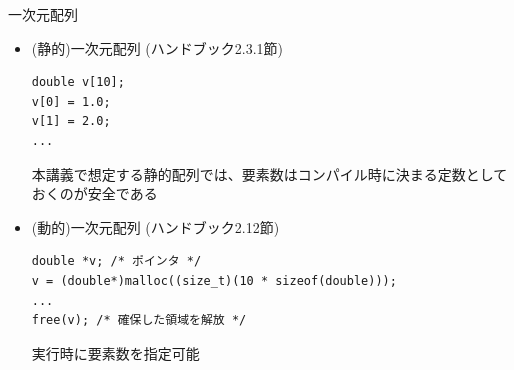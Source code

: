 \begin{frame}[t,fragile]{一次元配列}
  \begin{itemize}
  \item (静的)一次元配列 (ハンドブック2.3.1節)
\begin{lstlisting}
double v[10];
v[0] = 1.0;
v[1] = 2.0;
...
\end{lstlisting}
    本講義で想定する静的配列では、要素数はコンパイル時に決まる定数としておくのが安全である
  \item (動的)一次元配列 (ハンドブック2.12節)
\begin{lstlisting}
double *v; /* ポインタ */
v = (double*)malloc((size_t)(10 * sizeof(double)));
...
free(v); /* 確保した領域を解放 */
\end{lstlisting}
実行時に要素数を指定可能
  \end{itemize}
\end{frame}
